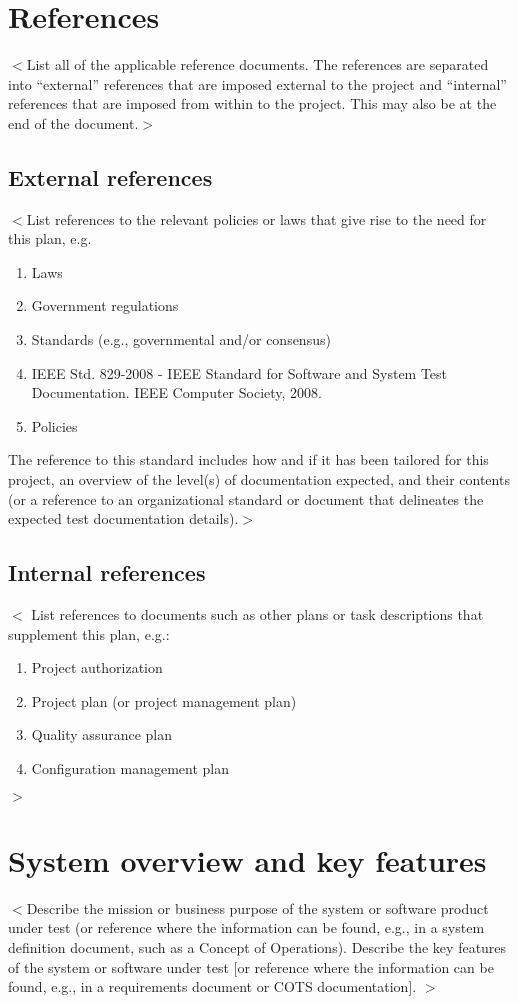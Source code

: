 \documentclass{scrreprt}
\begin{document}
\section{References}
$<$List all of the applicable reference documents. The references are separated into “external” references
that are imposed external to the project and “internal” references that are imposed from within to the
project. This may also be at the end of the document.$>$

\subsection*{External references}
$<$List references to the relevant policies or laws that give rise to the need for this plan, e.g.
\begin{enumerate}
	\item Laws
	\item Government regulations
	\item Standards (e.g., governmental and/or consensus)
	\item IEEE Std. 829-2008 - IEEE Standard for Software and System Test Documentation.
	IEEE Computer Society, 2008.
	\item Policies
\end{enumerate}
The reference to this standard includes how and if it has been tailored for this project, an overview of
the level(s) of documentation expected, and their contents (or a reference to an organizational standard
or document that delineates the expected test documentation details).$>$

\subsection*{Internal references}
$<$ List references to documents such as other plans or task descriptions that supplement this plan, e.g.:
\begin{enumerate}
	\item Project authorization
	\item Project plan (or project management plan)
	\item Quality assurance plan
	\item Configuration management plan
\end{enumerate}
$>$

\section{System overview and key features}
$<$Describe the mission or business purpose of the system or software product under test (or reference where the information can be found, e.g., in a system definition document, such as a Concept of
Operations). Describe the key features of the system or software under test [or reference where the information can be found, e.g., in a requirements document or COTS documentation]. $>$
\end{document}
